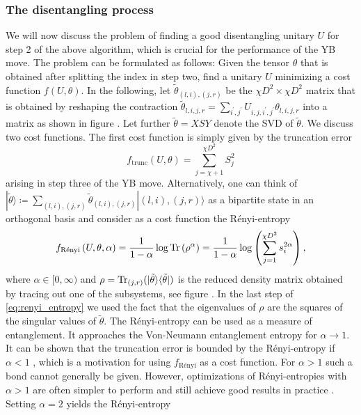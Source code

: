 \subsubsection*{The disentangling process}
We will now discuss the problem of finding a good disentangling unitary $U$ for step 2 of the above algorithm, which is crucial for the performance of the YB move. The problem can be formulated as follows: Given the tensor $\theta$ that is obtained after splitting the index in step two, find a unitary $U$ minimizing a cost function $f(U, \theta)$. In the following, let $\tilde{\theta}_{(l,i),(j,r)}$ be the $\chi D^2\times \chi D^2$ matrix that is obtained by reshaping the contraction $\tilde{\theta}_{l,i,j,r} = \sum_{i^\prime,j^\prime} U_{i,j,i^\prime,j^\prime}\theta_{l,i,j,r}$ into a matrix as shown in figure . Let further $\tilde{\theta} = XSY$ denote the SVD of $\tilde{\theta}$. We discuss two cost functions. The first cost function is simply given by the truncation error
\begin{equation}
	\label{eq:YB_move_disent_cost_function_truncation_error}
	f_\text{trunc}\left(U,\theta\right) = \sum_{j = \chi+1}^{\chi D^2}S_j^2
\end{equation}
arising in step three of the YB move. Alternatively, one can think of $|\tilde{\theta}\rangle \coloneqq \sum_{(l,i), (j,r)}\tilde{\theta}_{(l,i),(j,r)}|(l,i), (j, r)\rangle$ as a bipartite state in an orthogonal basis and consider as a cost function the Rényi-entropy
\begin{equation}
	\label{eq:renyi_entropy}
	f_\text{Rényi}\left(U,\theta,\alpha\right) = \frac{1}{1-\alpha}\log\operatorname{Tr}\left(\rho^\alpha\right) = \frac{1}{1-\alpha}\log\left(\sum_{j=1}^{\chi D^2}s_i^{2\alpha}\right),
\end{equation}
where $\alpha\in[0,\infty)$ and $\rho = \operatorname{Tr}_{(j, r)}(|\tilde{\theta}\rangle\langle\tilde{\theta}|)$ is the reduced density matrix obtained by tracing out one of the subsystems, see figure . In the last step of \eqref{eq:renyi_entropy} we used the fact that the eigenvalues of $\rho$ are the squares of the singular values of $\tilde{\theta}$. The Rényi-entropy can be used as a measure of entanglement. It approaches the Von-Neumann entanglement entropy for $\alpha\rightarrow 1$. It can be shown that the truncation error is bounded by the Rényi-entropy if $\alpha < 1$ \cite{cite:mps_represent_ground_states_faithfully}, which is a motivation for using $f_\text{Rényi}$ as a cost function. For $\alpha > 1$ such a bond cannot generally be given. However, optimizations of Rényi-entropies with $\alpha > 1$ are often simpler to perform and still achieve good results in practice \cite{cite:isometric_tensor_network_states_in_two_dimensions, cite:efficient_simulation_of_dynamics_in_two_dimensional_quantum_spin_systems, cite:finding_purifications_with_minimal_entanglement}. Setting $\alpha = 2$ yields the Rényi-entropy

